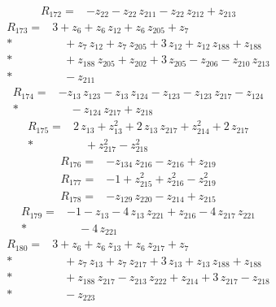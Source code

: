 \documentclass[10pt]{article}
\begin{document}
\begin{align*}
R_{172}={}& - z_{22} - z_{22}\,z_{211} - z_{22}\,z_{212} + z_{213}
\end{align*}
\begin{align*}
R_{173}={}& 3 + z_{6} + z_{6}\,z_{12} + z_{6}\,z_{205} + z_{7} \\*
&\quad + z_{7}\,z_{12} + z_{7}\,z_{205} + 3\,z_{12} + z_{12}\,z_{188} + z_{188} \\*
&\quad + z_{188}\,z_{205} + z_{202} + 3\,z_{205} - z_{206} - z_{210}\,z_{213} \\*
&\quad - z_{211}
\end{align*}
\begin{align*}
R_{174}={}& - z_{13}\,z_{123} - z_{13}\,z_{124} - z_{123} - z_{123}\,z_{217} - z_{124} \\*
&\quad - z_{124}\,z_{217} + z_{218}
\end{align*}
\begin{align*}
R_{175}={}& 2\,z_{13} + z_{13}^{2} + 2\,z_{13}\,z_{217} + z_{214}^{2} + 2\,z_{217} \\*
&\quad + z_{217}^{2} - z_{218}^{2}
\end{align*}
\begin{align*}
R_{176}={}& - z_{134}\,z_{216} - z_{216} + z_{219}
\end{align*}
\begin{align*}
R_{177}={}& - 1 + z_{215}^{2} + z_{216}^{2} - z_{219}^{2}
\end{align*}
\begin{align*}
R_{178}={}& - z_{129}\,z_{220} - z_{214} + z_{215}
\end{align*}
\begin{align*}
R_{179}={}& - 1 - z_{13} - 4\,z_{13}\,z_{221} + z_{216} - 4\,z_{217}\,z_{221} \\*
&\quad - 4\,z_{221}
\end{align*}
\begin{align*}
R_{180}={}& 3 + z_{6} + z_{6}\,z_{13} + z_{6}\,z_{217} + z_{7} \\*
&\quad + z_{7}\,z_{13} + z_{7}\,z_{217} + 3\,z_{13} + z_{13}\,z_{188} + z_{188} \\*
&\quad + z_{188}\,z_{217} - z_{213}\,z_{222} + z_{214} + 3\,z_{217} - z_{218} \\*
&\quad - z_{223}
\end{align*}
\end{document}
